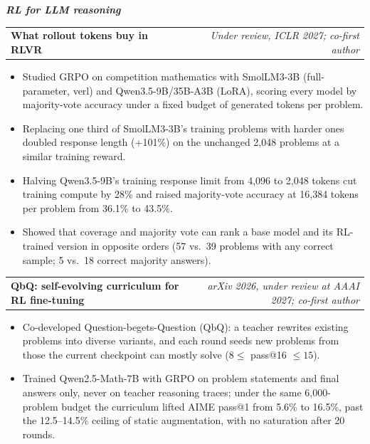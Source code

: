 \documentclass[10pt,letterpaper]{article}
\makeatletter
\newcommand{\project}[2]{%
  \vspace{2pt}%
  \begin{tabularx}{\linewidth}{@{}X r@{}}
    \textbf{#1} & \textit{#2} \\
  \end{tabularx}\par}
\newcommand{\theme}[1]{\vspace{2pt}\textit{\textbf{#1}}\par}
\makeatother
\begin{document}
\theme{RL for LLM reasoning}
\project{What rollout tokens buy in RLVR}{Under review, ICLR 2027; co-first author}
\begin{itemize}
  \item Studied GRPO on competition mathematics with SmolLM3-3B (full-parameter, verl) and Qwen3.5-9B/35B-A3B (LoRA), scoring every model by majority-vote accuracy under a fixed budget of generated tokens per problem.
  \item Replacing one third of SmolLM3-3B's training problems with harder ones doubled response length (+101\%) on the unchanged 2,048 problems at a similar training reward.
  \item Halving Qwen3.5-9B's training response limit from 4,096 to 2,048 tokens cut training compute by 28\% and raised majority-vote accuracy at 16,384 tokens per problem from 36.1\% to 43.5\%.
  \item Showed that coverage and majority vote can rank a base model and its RL-trained version in opposite orders (57 vs.\ 39 problems with any correct sample; 5 vs.\ 18 correct majority answers).
\end{itemize}
\project{QbQ: self-evolving curriculum for RL fine-tuning}{arXiv 2026, under review at AAAI 2027; co-first author}
\begin{itemize}
  \item Co-developed Question-begets-Question (QbQ): a teacher rewrites existing problems into diverse variants, and each round seeds new problems from those the current checkpoint can mostly solve ($8 \le$ pass@16 $\le 15$).
  \item Trained Qwen2.5-Math-7B with GRPO on problem statements and final answers only, never on teacher reasoning traces; under the same 6,000-problem budget the curriculum lifted AIME pass@1 from 5.6\% to 16.5\%, past the 12.5--14.5\% ceiling of static augmentation, with no saturation after 20 rounds.
\end{itemize}
\end{document}
